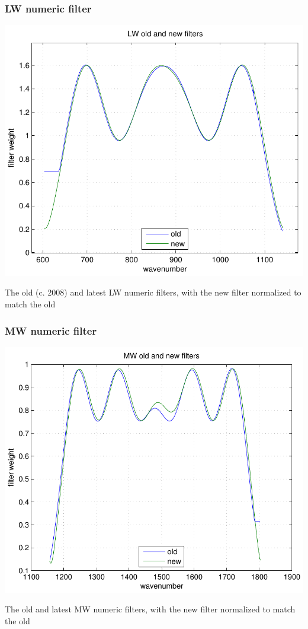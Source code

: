 \documentclass[11pt]{beamer}
\begin{document}
\begin{frame}
\frametitle{LW numeric filter}

\begin{center}
  \includegraphics[scale=0.5]{FIR_filter_LW.pdf}
\end{center}

The old (c. 2008) and latest LW numeric filters, with the new filter
normalized to match the old

\end{frame}
\begin{frame}
\frametitle{MW numeric filter}

\begin{center}
  \includegraphics[scale=0.5]{FIR_filter_MW.pdf}
\end{center}

The old and latest MW numeric filters, with the new filter
normalized to match the old

\end{frame}
\end{document}
